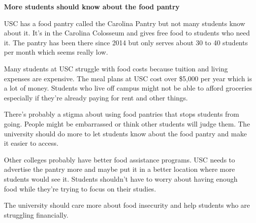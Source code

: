 \documentclass[12pt]{article}
\begin{document}
\newpage
\begin{originalversion}
\textbf{More students should know about the food pantry}

USC has a food pantry called the Carolina Pantry but not many students know about it. It's in the Carolina Colosseum and gives free food to students who need it. The pantry has been there since 2014 but only serves about 30 to 40 students per month which seems really low.

Many students at USC struggle with food costs because tuition and living expenses are expensive. The meal plans at USC cost over \$5,000 per year which is a lot of money. Students who live off campus might not be able to afford groceries especially if they're already paying for rent and other things.

There's probably a stigma about using food pantries that stops students from going. People might be embarrassed or think other students will judge them. The university should do more to let students know about the food pantry and make it easier to access.

Other colleges probably have better food assistance programs. USC needs to advertise the pantry more and maybe put it in a better location where more students would see it. Students shouldn't have to worry about having enough food while they're trying to focus on their studies.

The university should care more about food insecurity and help students who are struggling financially.
\end{originalversion}
\newpage
\end{document}
